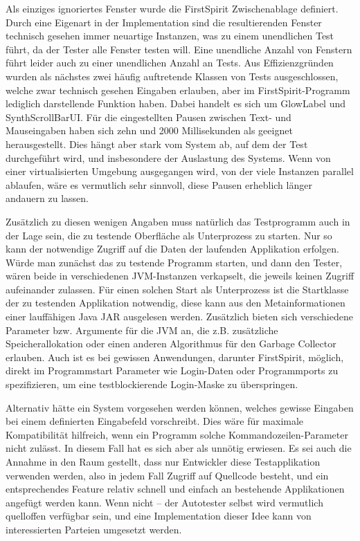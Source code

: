 Als einziges ignoriertes Fenster wurde die \glqq{}FirstSpirit Zwischenablage\grqq{} definiert. Durch eine
Eigenart in der Implementation sind die resultierenden Fenster technisch gesehen immer neuartige
Instanzen, was zu einem unendlichen Test führt, da der Tester alle Fenster testen will.
Eine unendliche Anzahl von Fenstern führt leider auch zu einer unendlichen Anzahl an Tests.
Aus Effizienzgründen wurden als nächstes zwei häufig auftretende Klassen von Tests ausgeschlossen,
welche zwar technisch gesehen Eingaben erlauben, aber im FirstSpirit-Programm lediglich
darstellende Funktion haben. Dabei handelt es sich um \glqq{}GlowLabel\grqq{} und \glqq{}SynthScrollBarUI\grqq{}.
Für die eingestellten Pausen zwischen Text- und Mauseingaben haben sich zehn und 2000 Millisekunden
als geeignet herausgestellt. Dies hängt aber stark vom System ab, auf dem der Test durchgeführt wird,
und insbesondere der Auslastung des Systems. Wenn von einer virtualisierten Umgebung ausgegangen
wird, von der viele Instanzen parallel ablaufen, wäre es vermutlich sehr sinnvoll, diese
Pausen erheblich länger andauern zu lassen.

Zusätzlich zu diesen wenigen Angaben muss natürlich das Testprogramm auch in der Lage sein,
die zu testende Oberfläche als Unterprozess zu starten. Nur so kann der notwendige Zugriff
auf die Daten der laufenden Applikation erfolgen. Würde man zunächst das zu testende
Programm starten, und dann den Tester, wären beide in verschiedenen JVM-Instanzen
verkapselt, die jeweils keinen Zugriff aufeinander zulassen. Für einen solchen
Start als Unterprozess ist die Startklasse der zu testenden Applikation notwendig,
diese kann aus den Metainformationen einer lauffähigen Java \glqq{}JAR\grqq{}
ausgelesen werden. Zusätzlich bieten sich verschiedene Parameter bzw. Argumente
für die JVM an, die z.B. zusätzliche Speicherallokation oder einen anderen
Algorithmus für den Garbage Collector erlauben. Auch ist es bei gewissen Anwendungen,
darunter FirstSpirit, möglich, direkt im Programmstart Parameter wie Login-Daten
oder Programmports zu spezifizieren, um eine testblockierende Login-Maske
zu überspringen.

Alternativ hätte ein System vorgesehen werden können, welches gewisse Eingaben
bei einem definierten Eingabefeld vorschreibt. Dies wäre für maximale Kompatibilität
hilfreich, wenn ein Programm solche Kommandozeilen-Parameter nicht zulässt.
In diesem Fall hat es sich aber als unnötig erwiesen. Es sei auch die
Annahme in den Raum gestellt, dass nur Entwickler diese Testapplikation
verwenden werden, also in jedem Fall Zugriff auf Quellcode besteht,
und ein entsprechendes Feature relativ schnell und einfach an bestehende
Applikationen angefügt werden kann. Wenn nicht -- der Autotester selbst
wird vermutlich quelloffen verfügbar sein, und eine Implementation
dieser Idee kann von interessierten Parteien umgesetzt werden.


